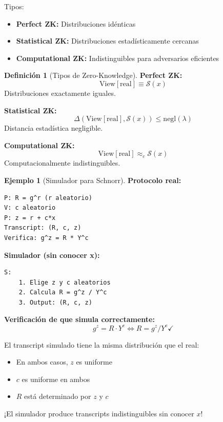 \documentclass[11pt,a4paper,twoside,openright]{book}
\theoremstyle{definition}
\newtheorem{definition}{Definición}[chapter]
\newtheorem{example}{Ejemplo}[chapter]
\theoremstyle{plain}
\theoremstyle{remark}
\begin{document}
Tipos:
\begin{itemize}
    \item \textbf{Perfect ZK:} Distribuciones idénticas
    \item \textbf{Statistical ZK:} Distribuciones estadísticamente cercanas
    \item \textbf{Computational ZK:} Indistinguibles para adversarios eficientes
\end{itemize}

\begin{definition}[Tipos de Zero-Knowledge]
\textbf{Perfect ZK:}
\[ \text{View}[\text{real}] \equiv \mathcal{S}(x) \]
Distribuciones exactamente iguales.

\textbf{Statistical ZK:}
\[ \Delta(\text{View}[\text{real}], \mathcal{S}(x)) \leq \text{negl}(\lambda) \]
Distancia estadística negligible.

\textbf{Computational ZK:}
\[ \text{View}[\text{real}] \approx_c \mathcal{S}(x) \]
Computacionalmente indistinguibles.
\end{definition}

\begin{example}[Simulador para Schnorr]
\textbf{Protocolo real:}
\begin{verbatim}
P: R = g^r (r aleatorio)
V: c aleatorio
P: z = r + c*x
Transcript: (R, c, z)
Verifica: g^z = R * Y^c
\end{verbatim}

\textbf{Simulador (sin conocer x):}
\begin{verbatim}
S: 
    1. Elige z y c aleatorios
    2. Calcula R = g^z / Y^c
    3. Output: (R, c, z)
\end{verbatim}

\textbf{Verificación de que simula correctamente:}
\[ g^z = R \cdot Y^c \iff R = g^z / Y^c \checkmark \]

El transcript simulado tiene la misma distribución que el real:
\begin{itemize}
    \item En ambos casos, $z$ es uniforme
    \item $c$ es uniforme en ambos
    \item $R$ está determinado por $z$ y $c$
\end{itemize}

¡El simulador produce transcripts indistinguibles sin conocer $x$!
\end{example}
\end{document}
